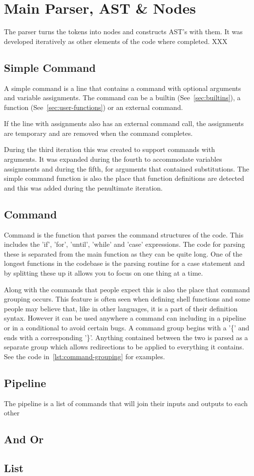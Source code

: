\section{Main Parser, AST \& Nodes}
The parser turns the tokens into nodes and constructs AST's with them.
It was developed iteratively as other elements of the code where completed. XXX

\subsection{Simple Command}
A simple command is a line that contains a command with optional arguments and variable assignments.
The command can be a builtin (See~\ref{sec:builtins}), a function (See~\ref{sec:user-functions}) or an external command.

If the line with assignments also has an external command call, the assignments are temporary and are removed when the command completes.

During the third iteration this was created to support commands with arguments.
It was expanded during the fourth to accommodate variables assignments and during the fifth, for arguments that contained substitutions.
The simple command function is also the place that function definitions are detected and this was added during the penultimate iteration.

\subsection{Command}
Command is the function that parses the command structures of the code.
This includes the 'if', 'for', 'until', 'while' and 'case' expressions.
The code for parsing these is separated from the main function as they can be quite long.
One of the longest functions in the codebase is the parsing routine for a case statement and by splitting these up it allows you to focus on one thing at a time.

Along with the commands that people expect this is also the place that command grouping occurs.
This feature is often seen when defining shell functions and some people may believe that, like in other languages, it is a part of their definition syntax.
However it can be used anywhere a command can including in a pipeline or in a conditional to avoid certain bugs.
A command group begins with a '\{' and ends with a corresponding '\}'.
Anything contained between the two is parsed as a separate group which allows redirections to be applied to everything it contains.
See the code in~\ref{lst:command-grouping} for examples.

\subsection{Pipeline}
The pipeline is a list of commands that will join their inputs and outputs to each other
\subsection{And Or}
\subsection{List}

